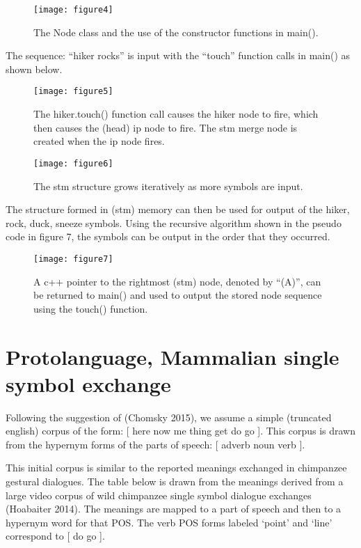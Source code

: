 \documentclass{clv3}
\begin{document}
 \begin{figure}
\texttt{[image: figure4]}
\caption{The Node class and the use of the constructor functions in main().}
\end{figure}

\vspace{.5cm}
 
The sequence: “hiker rocks” is input with the “touch” function calls in main() as shown below.    

\begin{figure}
\texttt{[image: figure5]}
\caption{The hiker.touch()  function call causes the hiker node to fire, which then causes the (head) ip node to fire.   The stm merge node is created when the ip node fires.}
\end{figure}




 \begin{figure}
\texttt{[image: figure6]}
\caption{The stm structure grows iteratively as more symbols are input.}
\end{figure}

The  structure formed in (stm) memory can then be used for output of the hiker, rock, duck, sneeze symbols.   Using the recursive algorithm shown in the pseudo code in figure 7, the symbols can be output in the order that they occurred.   

 \begin{figure}[H]
\texttt{[image: figure7]}
\caption{A c++ pointer to the rightmost (stm) node, denoted by ``(A)'', can be returned to main() and used to output the stored node sequence using the touch() function. }
\end{figure}



\section{Protolanguage,  Mammalian single symbol exchange}


Following the suggestion of (Chomsky 2015), we assume a simple (truncated english) corpus of the form:       [ here now me thing  get  do go  ].   This corpus is drawn from the hypernym forms of the parts of speech: [ adverb noun verb  ].   

This initial corpus is similar to the reported meanings exchanged in chimpanzee gestural dialogues.  The  table below is drawn from the meanings derived from a large video corpus of wild chimpanzee single symbol dialogue exchanges (Hoabaiter 2014).   The meanings are mapped to  a part of speech and then to a hypernym word for that POS.  The verb POS forms labeled ‘point’ and ‘line’ correspond to [ do go ]. 
\end{document}
